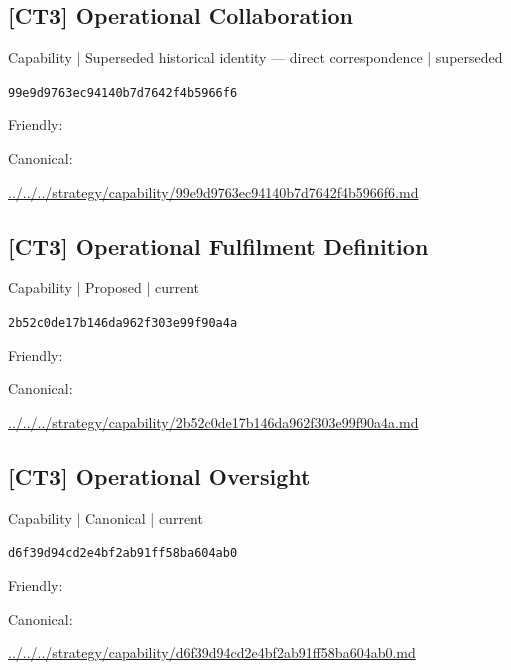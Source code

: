\documentclass[10pt,a4paper]{article}
\begin{document}
\subsection*{[CT3] Operational Collaboration}
{\small Capability | Superseded historical identity — direct correspondence | superseded}\par
\texttt{99e9d9763ec94140b7d7642f4b5966f6}\par
Friendly: \par
Canonical: \par
{\footnotesize\url{../../../strategy/capability/99e9d9763ec94140b7d7642f4b5966f6.md}}\par
\subsection*{[CT3] Operational Fulfilment Definition}
{\small Capability | Proposed | current}\par
\texttt{2b52c0de17b146da962f303e99f90a4a}\par
Friendly: \par
Canonical: \par
{\footnotesize\url{../../../strategy/capability/2b52c0de17b146da962f303e99f90a4a.md}}\par
\subsection*{[CT3] Operational Oversight}
{\small Capability | Canonical | current}\par
\texttt{d6f39d94cd2e4bf2ab91ff58ba604ab0}\par
Friendly: \par
Canonical: \par
{\footnotesize\url{../../../strategy/capability/d6f39d94cd2e4bf2ab91ff58ba604ab0.md}}\par
\end{document}
